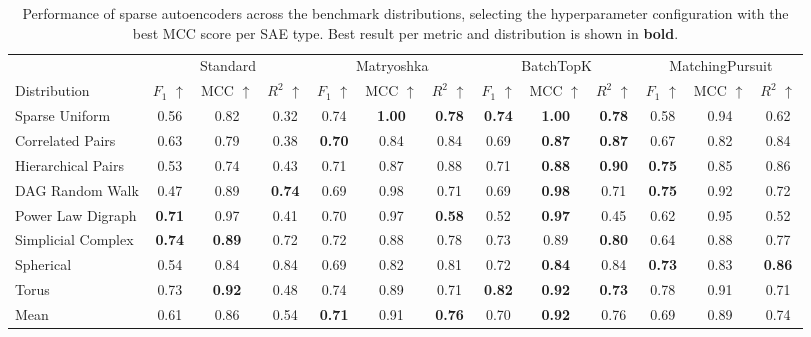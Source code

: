 \begin{table}[t]
  \centering

  \small
  \setlength{\tabcolsep}{4pt}

  \begin{tabular}{
      l
      ccc
      ccc
      ccc
      ccc
    }
    \toprule

    & \multicolumn{3}{c}{Standard}
    & \multicolumn{3}{c}{Matryoshka}
    & \multicolumn{3}{c}{BatchTopK}
    & \multicolumn{3}{c}{MatchingPursuit} \\

    \cmidrule(lr){2-4} \cmidrule(lr){5-7} \cmidrule(lr){8-10} \cmidrule(lr){11-13}

    Distribution
    & $F_1$ $\uparrow$ & MCC $\uparrow$ & $R^2$ $\uparrow$
    & $F_1$ $\uparrow$ & MCC $\uparrow$ & $R^2$ $\uparrow$
    & $F_1$ $\uparrow$ & MCC $\uparrow$ & $R^2$ $\uparrow$
    & $F_1$ $\uparrow$ & MCC $\uparrow$ & $R^2$ $\uparrow$\\

    \midrule

    Sparse Uniform       & 0.56 & 0.82 & 0.32 & 0.74 & \textbf{1.00} & \textbf{0.78} & \textbf{0.74} & \textbf{1.00} & \textbf{0.78} & 0.58 & 0.94 & 0.62 \\
    Correlated Pairs     & 0.63 & 0.79 & 0.38 & \textbf{0.70} & 0.84 & 0.84 & 0.69 & \textbf{0.87} & \textbf{0.87} & 0.67 & 0.82 & 0.84 \\
    Hierarchical Pairs   & 0.53 & 0.74 & 0.43 & 0.71 & 0.87 & 0.88 & 0.71 & \textbf{0.88} & \textbf{0.90} & \textbf{0.75} & 0.85 & 0.86 \\
    DAG Random Walk      & 0.47 & 0.89 & \textbf{0.74} & 0.69 & 0.98 & 0.71 & 0.69 & \textbf{0.98} & 0.71 & \textbf{0.75} & 0.92 & 0.72 \\
    Power Law Digraph    & \textbf{0.71} & 0.97 & 0.41 & 0.70 & 0.97 & \textbf{0.58} & 0.52 & \textbf{0.97} & 0.45 & 0.62 & 0.95 & 0.52 \\
    Simplicial Complex   & \textbf{0.74} & \textbf{0.89} & 0.72 & 0.72 & 0.88 & 0.78 & 0.73 & 0.89 & \textbf{0.80} & 0.64 & 0.88 & 0.77 \\
    Spherical            & 0.54 & 0.84 & 0.84 & 0.69 & 0.82 & 0.81 & 0.72 & \textbf{0.84} & 0.84 & \textbf{0.73} & 0.83 & \textbf{0.86} \\
    Torus                & 0.73 & \textbf{0.92} & 0.48 & 0.74 & 0.89 & 0.71 & \textbf{0.82} & \textbf{0.92} & \textbf{0.73} & 0.78 & 0.91 & 0.71 \\

    \midrule

    Mean                 & 0.61 & 0.86 & 0.54 & \textbf{0.71} & 0.91 & \textbf{0.76} & 0.70 & \textbf{0.92} & 0.76 & 0.69 & 0.89 & 0.74 \\

    \bottomrule
  \end{tabular}
  \caption{%
    Performance of sparse autoencoders across the benchmark distributions,
    selecting the hyperparameter configuration with the best MCC score per SAE type.
    Best result per metric and distribution is shown in \textbf{bold}.
  }
  \label{tab:results-best-mcc}

\end{table}
